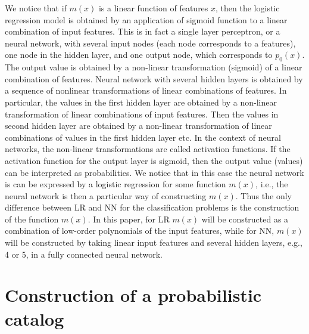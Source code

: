 We notice that if $m(x)$ is a linear function of features $x$, then the logistic regression model is obtained by an application of sigmoid function to a linear combination of input features.
This is in fact a single layer perceptron, or a neural network, with several input nodes (each node corresponds to a features), one node in the hidden layer, and one output node, which corresponds to $p_0(x)$.
The output value is obtained by a non-linear transformation (sigmoid) of a linear combination of features.
Neural network with several hidden layers is obtained by a sequence of nonlinear transformations of linear combinations of features.
In particular, the values in the first hidden layer are obtained by a non-linear transformation of linear combinations of input features.
Then the values in second hidden layer are obtained by a non-linear transformation of  linear combinations of values in the first hidden layer etc.
In the context of neural networks, the non-linear transformations are called activation functions.
If the activation function for the output layer is sigmoid, then the output value (values) can be interpreted as probabilities.
We notice that in this case the neural network is can be expressed by a logistic regression for some function $m(x)$,
i.e., the neural network is then a particular way of constructing $m(x)$.
Thus the only difference between LR and NN for the classification problems is the construction of the function $m(x)$.
In this paper, for LR $m(x)$ will be constructed as a combination of low-order polynomials of the input features,
while for NN, $m(x)$ will be constructed by taking linear input features and several hidden layers, e.g., 4 or 5, 
in a fully connected neural network.

\section{Construction of a probabilistic catalog}

